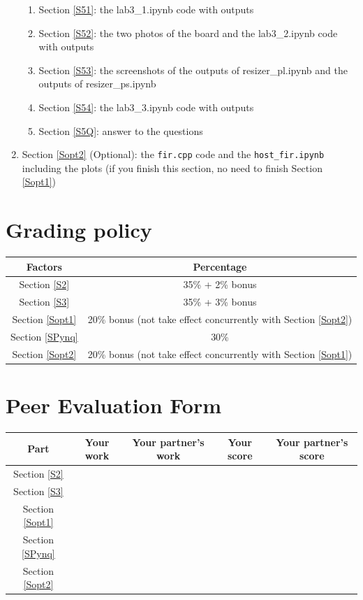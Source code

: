 \documentclass[a4paper,12pt,twoside]{article}
\begin{document}
\begin{enumerate}
\begin{enumerate}
        \item Section \ref{S51}: the lab3\_1.ipynb code with outputs
        \item Section \ref{S52}: the two photos of the board and the lab3\_2.ipynb code with outputs
        \item Section \ref{S53}: the screenshots of the outputs of resizer\_pl.ipynb and the outputs of resizer\_ps.ipynb
        \item Section \ref{S54}: the lab3\_3.ipynb code with outputs
        \item Section \ref{S5Q}: answer to the questions
    \end{enumerate}
    \item Section \ref{Sopt2} (Optional): the \texttt{fir.cpp} code and the \texttt{host\_fir.ipynb} including the plots (if you finish this section, no need to finish Section \ref{Sopt1})
\end{enumerate}
\section{Grading policy}
\begin{table}[H]
    \centering
    \begin{tabular}{|c|c|}
        \hline
        Factors & Percentage \\
        \hline
        Section \ref{S2} & 35\% + 2\% bonus \\
        \hline
        Section \ref{S3} & 35\% + 3\% bonus \\
        \hline
        Section \ref{Sopt1} & 20\% bonus (not take effect concurrently with Section \ref{Sopt2}) \\
        \hline
        Section \ref{SPynq} & 30\% \\
        \hline
        Section \ref{Sopt2} & 20\% bonus (not take effect concurrently with Section \ref{Sopt1}) \\
        \hline
    \end{tabular}
\end{table}

\newpage
\appendix
\section{Peer Evaluation Form}
\begin{table}[H]
    \centering
    \begin{tabular}{|c|c|c|c|c|}
        \hline
        Part & Your work & Your partner's work & Your score & Your partner's score \\
        \hline
        Section \ref{S2} & & & & \\
        \hline
        Section \ref{S3} & & & & \\
        \hline
        Section \ref{Sopt1} & & & & \\
        \hline
        Section \ref{SPynq} & & & & \\
        \hline
        Section \ref{Sopt2} & & & & \\
        \hline
    \end{tabular}
\end{table}
\end{document}
